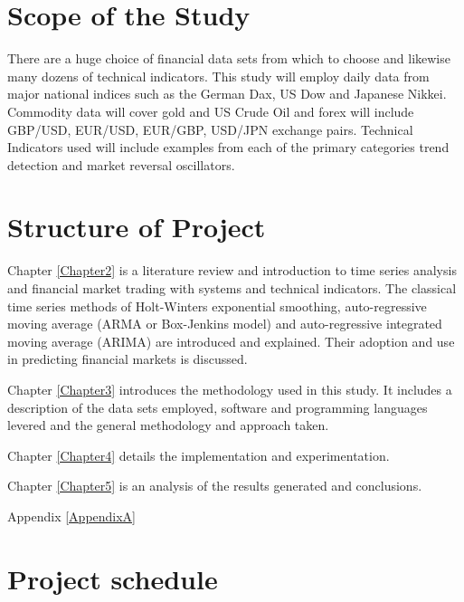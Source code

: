 \section{Scope of the Study }
There are a huge choice of financial data sets from which to choose and likewise many dozens of technical indicators. This study will employ daily data from major national indices such as the German Dax, US Dow and Japanese Nikkei. Commodity data will cover gold and US Crude Oil and forex will include GBP/USD, EUR/USD, EUR/GBP, USD/JPN exchange pairs. Technical Indicators used will include examples from each of the primary categories trend detection and market reversal oscillators.

\section{Structure of Project}
Chapter \ref{Chapter2} is a literature review and introduction to time series analysis and financial market trading with systems and technical indicators. The classical time series methods of Holt-Winters exponential smoothing, auto-regressive moving average (ARMA or Box-Jenkins model) and auto-regressive integrated moving average (ARIMA) are introduced and explained. Their adoption and use in predicting financial markets is discussed.

Chapter \ref{Chapter3} introduces the methodology used in this study. It includes a description of the data sets employed, software and programming languages levered and the general methodology and approach taken.

Chapter \ref{Chapter4} details the implementation and experimentation.

Chapter \ref{Chapter5} is an analysis of the results generated and conclusions.

Appendix \ref{AppendixA}

\section{Project schedule}


